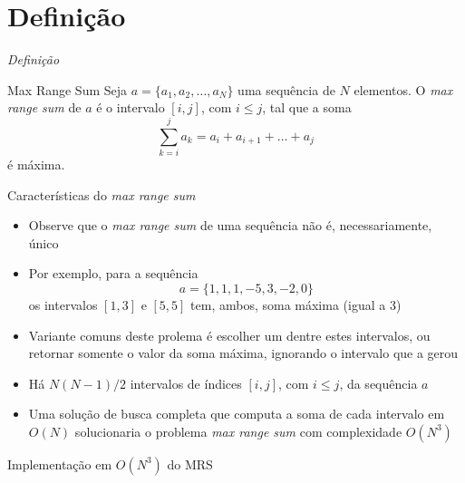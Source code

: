 \section{Definição}

\begin{frame}[fragile]{{\it Definição}}

    \begin{block}{Max Range Sum}
        Seja $a = \{a_1, a_2, \ldots, a_N\}$ uma sequência de $N$ elementos. O \textit{max range
            sum} de $a$ é o intervalo $[i, j]$, com $i \leq j$, tal que a soma
        \[
            \sum_{k = i}^j a_k = a_i + a_{i + 1} + \ldots + a_j
        \]
        é máxima.
    \end{block}

\end{frame}

\begin{frame}[fragile]{Características do {\it max range sum}}

    \begin{itemize}
        \item Observe que o \textit{max range sum} de uma sequência não é, necessariamente,
            único

        \item Por exemplo, para a sequência
        \[
            a = \{ 1, 1, 1, -5, 3, -2, 0 \}
        \]
        os intervalos $[1, 3]$ e $[5, 5]$ tem, ambos, soma máxima (igual a 3)

        \item Variante comuns deste prolema é  escolher um dentre estes intervalos, ou retornar
            somente o valor da soma máxima, ignorando o intervalo que a gerou

        \item Há $N(N - 1)/2$ intervalos de índices $[i, j]$, com $i\leq j$, da sequência $a$

        \item Uma solução de busca completa que computa a soma de cada intervalo em $O(N)$
            solucionaria o problema \textit{max range sum} com complexidade $O(N^3)$

    \end{itemize}

\end{frame}

\begin{frame}[fragile]{Implementação em $O(N^3)$ do MRS}
\end{frame}

